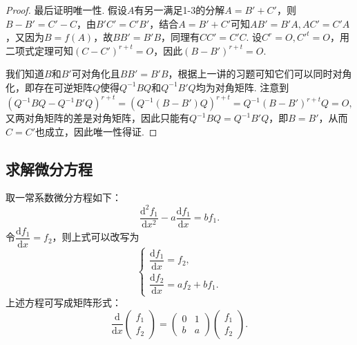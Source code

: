 \begin{proof}
    最后证明唯一性. 假设$A$有另一满足1-3的分解$A=B'+C'$，则$B-B'=C'-C$，由$B'C'=C'B'$，结合$A=B'+C'$可知$AB'=B'A,AC'=C'A$，又因为$B=f(A)$，故$BB'=B'B$，同理有$CC'=C'C$. 设$C^r=O,C'^t=O$，用二项式定理可知$(C-C')^{r+t}=O$，因此$(B-B')^{r+t}=O$.

    我们知道$B$和$B'$可对角化且$BB'=B'B$，根据上一讲的习题可知它们可以同时对角化，即存在可逆矩阵$Q$使得$Q^{-1}BQ$和$Q^{-1}B'Q$均为对角矩阵. 注意到
    \[(Q^{-1}BQ-Q^{-1}B'Q)^{r+t}=(Q^{-1}(B-B')Q)^{r+t}=Q^{-1}(B-B')^{r+t}Q=O,\]
    又两对角矩阵的差是对角矩阵，因此只能有$Q^{-1}BQ=Q^{-1}B'Q$，即$B=B'$，从而$C=C'$也成立，因此唯一性得证.
\end{proof}

\subsection{求解微分方程}

取一常系数微分方程如下：
\[\dfrac{\mathrm{d}^2f_1}{\mathrm{d}x^2}-a\dfrac{\mathrm{d}f_1}{\mathrm{d}x}=bf_1.\]
令$\dfrac{\mathrm{d}f_1}{\mathrm{d}x}=f_2$，则上式可以改写为
\[\begin{cases}
        \dfrac{\mathrm{d}f_1}{\mathrm{d}x}=f_2, \\[0.5em]
        \dfrac{\mathrm{d}f_2}{\mathrm{d}x}=af_2+bf_1.
    \end{cases}\]
上述方程可写成矩阵形式：
\[\dfrac{\mathrm{d}}{\mathrm{d}x}\begin{pmatrix}
        f_1 \\ f_2
    \end{pmatrix}=\begin{pmatrix}
        0 & 1 \\ b & a
    \end{pmatrix}\begin{pmatrix}
        f_1 \\ f_2
    \end{pmatrix}.\]

